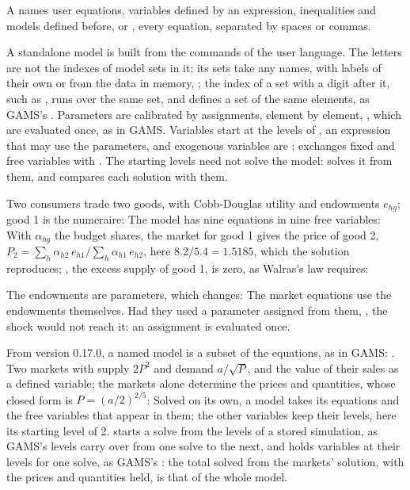 \noindent A  names user equations, variables defined by an
expression, inequalities and models defined before, or , every
equation, separated by spaces or commas.


A standalone model is built from the commands of the user language. The
letters  are not the indexes of model sets in it: its sets
take any names, with labels of their own or from the data in memory,
; the index of a set with a digit after it,
such as , runs over the same set, and  defines a
set of the same elements, as GAMS's . Parameters are calibrated by
assignments, element by element, , which are evaluated once, as in GAMS. Variables start at
the levels of , an expression that may use the parameters,
and exogenous variables are ;  exchanges
fixed and free variables with . The starting levels need not
solve the model:  solves it from them, and
 compares each solution with them.


Two consumers trade two goods, with Cobb-Douglas utility and endowments
$e_{hg}$; good 1 is the numeraire:
The model has nine equations in nine free variables:
With $\alpha_{hg}$ the budget shares, the market for good 1 gives the price
of good 2, $P_2 = \sum_h \alpha_{h2}\,e_{h1} / \sum_h \alpha_{h1}\,e_{h2}$,
here $8.2/5.4 = 1.5185$, which the solution reproduces; , the
excess supply of good 1, is zero, as Walras's law requires:


The endowments are parameters, which  changes:
The market equations use the endowments themselves. Had they used a
parameter assigned from them, , the shock would not reach it: an assignment is evaluated once.


From version 0.17.0, a named model is a subset of the equations, as in GAMS:
. Two markets with supply $2P^2$ and demand
$a/\sqrt{P}$, and the value of their sales as a defined variable; the
markets alone determine the prices and quantities, whose closed form is $P =
(a/2)^{2/5}$:
Solved on its own, a model takes its equations and the free variables that
appear in them; the other variables keep their levels, here  its
starting level of 2.  starts a solve from the levels of a
stored simulation, as GAMS's levels carry over from one solve to the next,
and  holds variables at their levels for one solve, as GAMS's
: the total solved from the markets' solution, with the prices
and quantities held, is that of the whole model.

